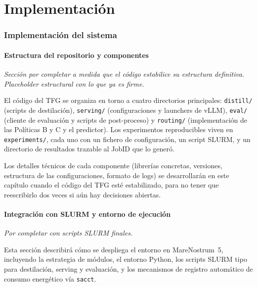 \documentclass[11pt,a4paper]{article}
\begin{document}
\part{Implementación}
\label{part:implementacion}

\section{Implementación del sistema}
\label{sec:implementacion-sistema}

\subsection{Estructura del repositorio y componentes}

\textit{Sección por completar a medida que el código estabilice su estructura definitiva. Placeholder estructural con lo que ya es firme.}

El código del TFG se organiza en torno a cuatro directorios principales: \texttt{distill/} (scripts de destilación), \texttt{serving/} (configuraciones y launchers de vLLM), \texttt{eval/} (cliente de evaluación y scripts de post-proceso) y \texttt{routing/} (implementación de las Políticas B y C y el predictor). Los experimentos reproducibles viven en \texttt{experiments/}, cada uno con un fichero de configuración, un script SLURM, y un directorio de resultados trazable al JobID que lo generó.

Los detalles técnicos de cada componente (librerías concretas, versiones, estructura de las configuraciones, formato de logs) se desarrollarán en este capítulo cuando el código del TFG esté estabilizado, para no tener que reescribirlo dos veces si aún hay decisiones abiertas.

\subsection{Integración con SLURM y entorno de ejecución}

\textit{Por completar con scripts SLURM finales.}

Esta sección describirá cómo se despliega el entorno en MareNostrum~5, incluyendo la estrategia de módulos, el entorno Python, los scripts SLURM tipo para destilación, serving y evaluación, y los mecanismos de registro automático de consumo energético vía \texttt{sacct}.
\end{document}
